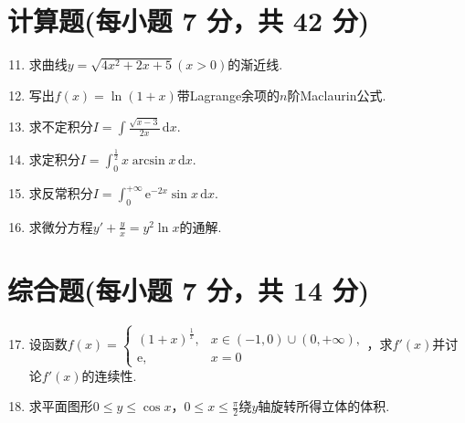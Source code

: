 \documentclass[../Main.tex]{subfiles}
\begin{document}
\section{计算题(每小题 7 分，共 42 分)}
\begin{enumerate}
    \setcounter{enumi}{10}
    \item 求曲线$y=\sqrt{4x^{2}+2x+5}(x>0)$的渐近线.
          \vspace{12em}

    \item 写出$f(x)=\ln(1+x)$带Lagrange余项的$n$阶Maclaurin公式.
          \vspace{12em}

    \item 求不定积分$I=\int \frac{\sqrt{x-3}}{2x}\,\mathrm{d}x$.
          \vspace{12em}

    \item 求定积分$I=\int_{0}^{\frac{1}{2}}x\arcsin x\,\mathrm{d}x$.
          \vspace{11em}

    \item 求反常积分$I= \int_{0}^{+\infty}\mathrm{e}^{-2x}\sin x\,\mathrm{d}x$.
          \vspace{12em}

    \item 求微分方程$y'+\frac{y}{x}=y^{2}\ln x$的通解.
          \vspace{12em}
\end{enumerate}

\section{综合题(每小题 7 分，共 14 分)}
\begin{enumerate}
    \setcounter{enumi}{16}
    \item 设函数$f(x)=
              \begin{cases}
                  (1+x)^{\frac{1}{x}}, & x\in(-1,0)\cup(0,+\infty), \\
                  \mathrm{e},          & x=0
              \end{cases}$，求$f'(x)$并讨论$f'(x)$的连续性.
          \vspace{12em}

    \item 求平面图形$0\leq y\leq \cos x$，$0\leq x\leq \frac{\pi}{2}$绕$y$轴旋转所得立体的体积.
          \vspace{15em}
\end{enumerate}
\end{document}
